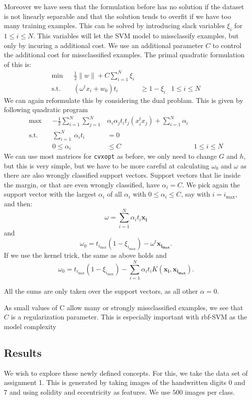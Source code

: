 Moreover we have seen that the formulation before has no solution if the dataset is not linearly separable and that the solution tends to overfit if we have too many training examples. This can be solved by introducing slack variables $\xi_i$ for $1 \leq i \leq N$. This variables will let the SVM model to missclassify examples, but only by incuring a additional cost. We use an additional parameter $C$ to control the additional cost for missclassified examples. The primal quadratic formulation of this is:
\begin{align*}
	\min&&  \frac{1}{2}\lVert w \rVert + C \sum\limits_{i=1}^N \xi_i &\\
	\text{s.t.}&& (\omega^tx_i+w_0)t_i &\geq 1 - \xi_i &1 \leq i \leq N
\end{align*}
We can again reformulate this by considering the dual problam. This is given by following quadratic program
\begin{align*}
	\max&& - \frac{1}{2} \sum\limits_{i=1}^N \sum\limits_{j=1}^N&\alpha_i\alpha_jt_it_j(x_i^tx_j) +  \sum\limits_{i=1}^N \alpha_i &\\
	\text{s.t.}&& \sum\limits_{i=1}^N\ \alpha_i t_i &= 0& \\
	&&0\leq\alpha_i&\leq C& 1\leq i \leq N
\end{align*}
We can use most matrices for \texttt{cvxopt} as before, we only need to change $G$ and $h$, but this is very simple, but we have to be more careful at calculating $\omega_0$ and $\omega$ as there are also wrongly classified support vectors. Support vectors that lie inside the margin, or that are even wrongly classified, have $\alpha_i=C$. We pick again the support vector with the largest $\alpha_i$ of all $\alpha_i$ with $0\leq \alpha_i \leq C$, say with $i = i_{\max}$, and then:
\[
	\omega = \sum\limits_{i=1}^N\alpha_i t_i \bm{x_i}
\]
and 
\[
	\omega_0 = t_{i_{\max}}(1- \xi_{i_{\max}}) - \omega^t\bm{x_{i_{\max}}}.
\]
If we use the kernel trick, the same as above holds and
\[
	\omega_0 = t_{i_{\max}}(1- \xi_{i_{\max}}) -  \sum\limits_{i=1}^N\alpha_i t_i K(\bm{x_i},\bm{x_{i_{\max}}}).
\]

All the sums are only taken over the support vectors, as all other $\alpha=0$.

As small values of C allow many or strongly missclassified examples, we see that $C$ is a regularization parameter. This is especially important with rbf-SVM as the model complexity 

\subsection{Results} 
We wish to explore these newly defined concepts. For this, we take the data set of assignment 1. This is generated by taking images of the handwritten digits $0$ and $7$ and using solidity and eccentricity as features. We use $500$ images per class. 

